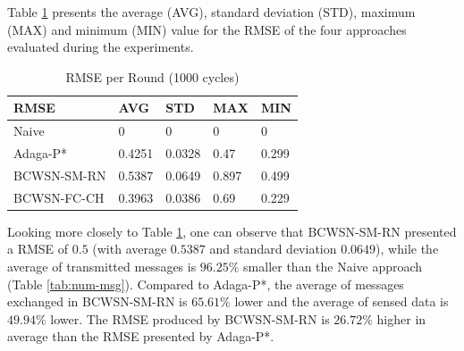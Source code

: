 \documentclass{acm_proc_article-sp}
\begin{document}
% 


Table \ref{tab:rmse} presents the average (AVG), standard deviation (STD),
maximum (MAX) and minimum (MIN) value for the RMSE of the four approaches
evaluated during the experiments.

\begin{table}[h!]
\caption{RMSE per Round (1000 cycles)}
\label{tab:rmse}
\begin{center}
\begin{tabular}{|l||l|l|l|l|}
\hline
RMSE &AVG &STD &MAX &MIN \\
\hline\hline
Naive &0 &0 &0 &0 \\
\hline
Adaga-P* &0.4251 &0.0328 &0.47 &0.299 \\
\hline
BCWSN-SM-RN &0.5387 &0.0649 &0.897 &0.499 \\
\hline
BCWSN-FC-CH &0.3963 &0.0386 &0.69 &0.229 \\
\hline
\end{tabular}
\end{center}
\end{table}


Looking more closely to Table \ref{tab:rmse}, one can observe that BCWSN-SM-RN
presented a RMSE of $0.5$ (with average $0.5387$ and standard deviation $0.0649$),
while the average of transmitted messages is $96.25\%$ smaller than the Naive
approach (Table \ref{tab:num-msg}). Compared to Adaga-P*, the average of
messages exchanged in BCWSN-SM-RN is $65.61\%$ lower and the average of sensed
data is $49.94\%$ lower. The RMSE produced by BCWSN-SM-RN is $26.72\%$ higher in
average than the RMSE presented by Adaga-P*.
\end{document}
